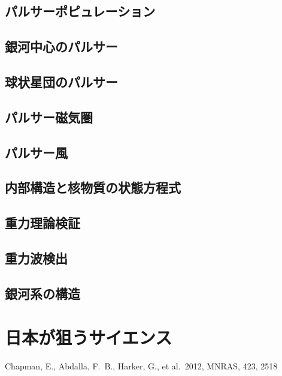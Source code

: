 \documentclass[a4j,twoside,11pt]{jreport}
\begin{document}
\subsection{パルサーポピュレーション}

\subsection{銀河中心のパルサー}

\subsection{球状星団のパルサー}

\subsection{パルサー磁気圏}

\subsection{パルサー風}

\subsection{内部構造と核物質の状態方程式}

\subsection{重力理論検証}

\subsection{重力波検出}

\subsection{銀河系の構造}



\newpage

\section{日本が狙うサイエンス}\label{pulsar.s3}





\begin{thebibliography}{99}

Chapman, E., Abdalla, F.~B., Harker, G., et al.\ 2012, MNRAS, 423, 2518 


\end{thebibliography}
\end{document}
